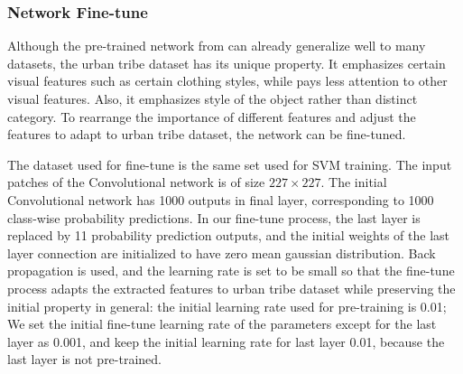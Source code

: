 \documentclass[10pt,twocolumn,letterpaper]{article}
\begin{document}
\subsubsection{Network Fine-tune}
Although the pre-trained network from \cite{caffe} can already generalize well to many datasets, the urban tribe dataset has its unique property. It emphasizes certain visual features such as certain clothing styles, while pays less attention to other visual features. Also, it emphasizes style of the object rather than distinct category. To rearrange the importance of different features and adjust the features to adapt to urban tribe dataset, the network can be fine-tuned. 

The dataset used for fine-tune is the same set used for SVM training. The input patches of the Convolutional network is of size $227 \times 227$. The initial Convolutional network has 1000 outputs in final layer, corresponding to 1000 class-wise probability predictions. In our fine-tune process, the last layer is replaced by 11 probability prediction outputs, and the initial weights of the last layer connection are initialized to have zero mean gaussian distribution. Back propagation is used, and the learning rate is set to be small so that the fine-tune process adapts the extracted features to urban tribe dataset while preserving the initial property in general: the initial learning rate used for pre-training is 0.01; We set the initial fine-tune learning rate of the parameters except for the last layer as 0.001, and keep the initial learning rate for last layer 0.01, because the last layer is not pre-trained.



\end{document}
